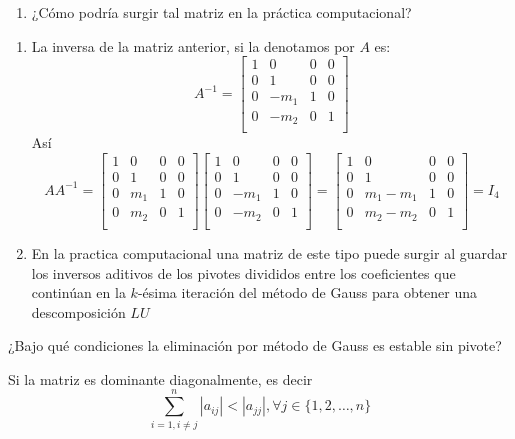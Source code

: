 \documentclass[paper=letter, fontsize=11pt]{scrartcl}
\numberwithin{equation}{section} %
\numberwithin{figure}{section} %
\numberwithin{table}{section} %
\newenvironment{cframed}[1][blue]
  {\begin{tcolorbox}[colframe=#1,colback=white]}
  {\end{tcolorbox}}
\begin{document}
\begin{enumerate}
\begin{cframed}[teal]
\begin{enumerate}
\item ¿Cómo podría surgir tal matriz en la práctica computacional?
\end{enumerate}
\end{cframed}

\begin{enumerate}
\item 
La inversa de la matriz anterior, si la denotamos por $A$ es: 
\[
A^{-1} = \begin{bmatrix}
1 & 0& 0 & 0   \\
0 & 1& 0& 0\\
0 & -m_1 & 1 & 0 \\
0& -m_2 & 0 & 1\\
\end{bmatrix}
\] 
Así 
\[
AA^{-1} = \begin{bmatrix}
1 & 0& 0 & 0   \\
0 & 1& 0& 0\\
0 & m_1 & 1 & 0 \\
0& m_2 & 0 & 1\\
\end{bmatrix} 
\begin{bmatrix}
1 & 0& 0 & 0   \\
0 & 1& 0& 0\\
0 & -m_1 & 1 & 0 \\
0& -m_2 & 0 & 1\\
\end{bmatrix}= \begin{bmatrix}
1 & 0& 0 & 0   \\
0 & 1& 0& 0\\
0 & m_1 -m_1 & 1 & 0 \\
0& m_2 - m_2& 0 & 1\\
\end{bmatrix} = I_4
\]

\item  En la practica computacional una matriz de este tipo puede surgir al guardar los inversos aditivos de los pivotes divididos entre los coeficientes que continúan en la $k$-ésima iteración del método de Gauss para obtener una descomposición $LU$
\end{enumerate}

\begin{cframed}[purple]
\item ¿Bajo qué condiciones la eliminación por método de Gauss es estable sin pivote?
\end{cframed}
Si la matriz es dominante diagonalmente, es decir 
\[
\sum_{i=1,i\ne j}^{n}|a_{ij}| < |a_{jj}|, \forall j \in \{1,2,\dots, n\}
\]









\end{enumerate}
\end{document}
